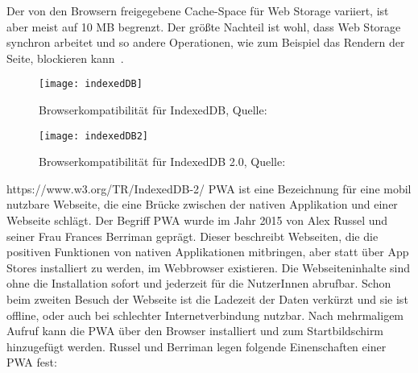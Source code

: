 Der von den Browsern freigegebene Cache-Space für Web Storage variiert, ist aber meist auf 10 MB begrenzt. Der größte Nachteil ist wohl, dass Web Storage synchron arbeitet und so andere Operationen, wie zum Beispiel das Rendern der Seite, blockieren kann~\cite{webstorage-con}.
%
%
\begin{figure}[H]
	\centering
	\texttt{[image: indexedDB]}
	\grayRule
	\caption{Browserkompatibilität für IndexedDB, Quelle: ~\cite{caniuse-idb}}
	\label{fig:indexedDB}
\end{figure}
%
\begin{figure}[H]
	\centering
	\texttt{[image: indexedDB2]}
	\grayRule
	\caption{Browserkompatibilität für IndexedDB 2.0, Quelle: ~\cite{caniuse-idb}}
	\label{fig:indexedDB2}
\end{figure}
https://www.w3.org/TR/IndexedDB-2/
%
%
%
%
\Gls{PWA} ist eine Bezeichnung für eine mobil nutzbare Webseite, die eine Brücke zwischen der nativen
Applikation und einer Webseite schlägt.
Der Begriff \gls{PWA} wurde im Jahr 2015  von Alex Russel und seiner Frau Frances Berriman geprägt.
Dieser beschreibt Webseiten, die die positiven Funktionen von nativen Applikationen mitbringen, aber statt über App Stores installiert zu werden, im Webbrowser existieren. Die Webseiteninhalte sind ohne die Installation sofort und jederzeit für die NutzerInnen abrufbar. Schon beim zweiten Besuch der Webseite ist die Ladezeit der Daten verkürzt und sie ist offline, oder auch bei schlechter Internetverbindung nutzbar. Nach mehrmaligem Aufruf kann die \gls{PWA} über den Browser installiert und zum Startbildschirm hinzugefügt werden. Russel und Berriman legen folgende Einenschaften einer \gls{PWA} fest:
